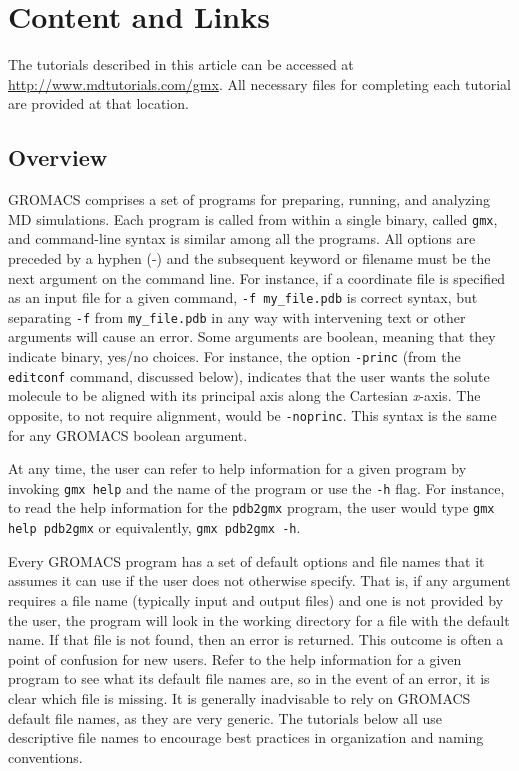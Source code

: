 \documentclass[9pt,tutorial]{livecoms}
\newcommand{\urlstring}{http://www.mdtutorials.com/gmx}
\newcommand{\tutorialhomeurl}{\url{\urlstring}}
\begin{document}
\section{Content and Links}


The tutorials described in this article can be accessed at \tutorialhomeurl. All necessary files for completing each tutorial are provided at that location.

\subsection{Overview}

GROMACS comprises a set of programs for preparing, running, and analyzing MD simulations. Each program is called from within a single binary, called \texttt{gmx}, and command-line syntax is similar among all the programs. All options are preceded by a hyphen (-) and the subsequent keyword or filename must be the next argument on the command line. For instance, if a coordinate file is specified as an input file for a given command, \texttt{-f my\_file.pdb} is correct syntax, but separating \texttt{-f} from \texttt{my\_file.pdb} in any way with intervening text or other arguments will cause an error. Some arguments are boolean, meaning that they indicate binary, yes/no choices. For instance, the option \texttt{-princ} (from the \texttt{editconf} command, discussed below), indicates that the user wants the solute molecule to be aligned with its principal axis along the Cartesian {\em x}-axis. The opposite, to not require alignment, would be \texttt{-noprinc}. This syntax is the same for any GROMACS boolean argument.

At any time, the user can refer to help information for a given program by invoking \texttt{gmx help} and the name of the program or use the \texttt{-h} flag. For instance, to read the help information for the \texttt{pdb2gmx} program, the user would type \texttt{gmx help pdb2gmx} or equivalently, \texttt{gmx pdb2gmx -h}.

Every GROMACS program has a set of default options and file names that it assumes it can use if the user does not otherwise specify. That is, if any argument requires a file name (typically input and output files) and one is not provided by the user, the program will look in the working directory for a file with the default name. If that file is not found, then an error is returned. This outcome is often a point of confusion for new users. Refer to the help information for a given program to see what its default file names are, so in the event of an error, it is clear which file is missing. It is generally inadvisable to rely on GROMACS default file names, as they are very generic. The tutorials below all use descriptive file names to encourage best practices in organization and naming conventions.
\end{document}
